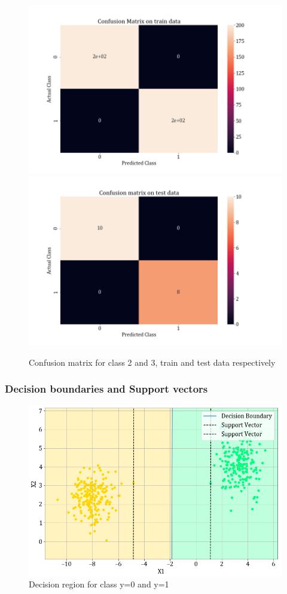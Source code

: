 \documentclass[11pt,a4paper]{article}
\newcommand{\noi}{\noindent}
\begin{document}
\begin{figure}[H]
\centering
\includegraphics[scale=0.4]{images/1A_ovo_conf23_train.png}
\includegraphics[scale=0.4]{images/1A_ovo_conf23_test.png}
\caption{Confusion matrix for class 2 and 3, train and test data respectively}
\end{figure}
\noi 

\subsubsection{Decision boundaries and Support vectors}
\begin{figure}[H]
    \centering
    \includegraphics[scale=0.55]{images/1A_ovo_01.png}
    \caption{Decision region for class y=0 and y=1}
\end{figure}
\end{document}
